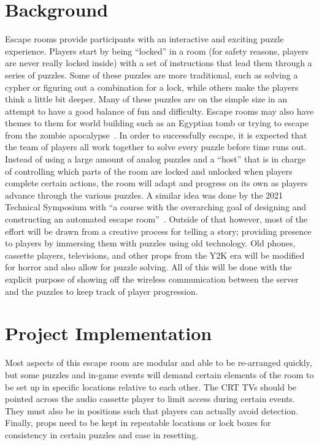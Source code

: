 \documentclass[conference]{IEEEtran}
\begin{document}
\section{Background}
\indent Escape rooms provide participants with an interactive and exciting puzzle experience.
Players start by being ``locked'' in a room (for safety reasons, players are never really
locked inside) with a set of instructions that lead them through a series of puzzles. Some of
these puzzles are more traditional, such as solving a cypher or figuring out a combination for a lock,
while others make the players think a little bit deeper. Many of these puzzles are on the simple size in
an attempt to have a good balance of fun and difficulty. Escape rooms may also have themes to them for world building
such as an Egyptian tomb or trying to escape from the zombie
apocalypse~\cite{wikipediaEscapeRoom}. In order to successfully escape, it is expected that the team of players
all work together to solve every puzzle before time runs out.
\\
\indent Instead of using a large amount of analog puzzles and a ``host'' that is in charge of controlling which parts of
the room are locked and unlocked when players complete certain actions, the room will adapt and progress on its
own as players advance through the various puzzles. A similar idea was done by the 2021 Technical Symposium with
``a course with the overarching goal of designing and constructing an automated escape room''~\cite{germanEscapeRoom}. Outside
of that however, most of the effort will be drawn from a creative process for telling a story; providing presence
to players by immersing them with puzzles using old technology. Old phones, cassette players, televisions, and other
props from the Y2K era will be modified for horror and also allow for puzzle solving. All of this will be done
with the explicit purpose of showing off the wireless communication between the server and the puzzles to keep track
of player progression. 

\section{Project Implementation}
\indent Most aspects of this escape room are modular and able to be re-arranged quickly,
but some puzzles and in-game events will demand certain elements of the room to be set up in specific locations relative
to each other. The CRT TVs should be pointed across the audio cassette player to limit
access during certain events. They must also be in positions such that players can actually avoid detection.
Finally, props need to be kept in repeatable locations or lock boxes for consistency in certain puzzles and ease in resetting.
\end{document}
